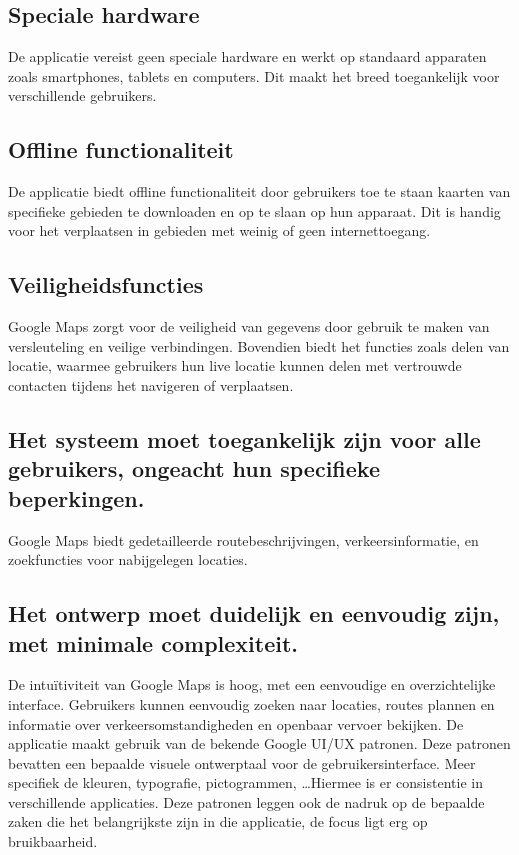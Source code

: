 \subsection*{Speciale hardware}
De applicatie vereist geen speciale hardware en werkt op standaard apparaten zoals smartphones, tablets en computers. Dit maakt het breed toegankelijk voor verschillende gebruikers.

\subsection*{Offline functionaliteit}
De applicatie biedt offline functionaliteit door gebruikers toe te staan kaarten van specifieke gebieden te downloaden en op te slaan op hun apparaat. Dit is handig voor het verplaatsen in gebieden met weinig of geen internettoegang.

\subsection*{Veiligheidsfuncties}
Google Maps zorgt voor de veiligheid van gegevens door gebruik te maken van versleuteling en veilige verbindingen. Bovendien biedt het functies zoals delen van locatie, waarmee gebruikers hun live locatie kunnen delen met vertrouwde contacten tijdens het navigeren of verplaatsen.

\subsection*{Het systeem moet toegankelijk zijn voor alle gebruikers, ongeacht hun specifieke beperkingen.}
Google Maps biedt gedetailleerde routebeschrijvingen, verkeersinformatie, en zoekfuncties voor nabijgelegen locaties.
\subsection*{Het ontwerp moet duidelijk en eenvoudig zijn, met minimale complexiteit.}
De intuïtiviteit van Google Maps is hoog, met een eenvoudige en overzichtelijke interface. Gebruikers kunnen eenvoudig zoeken naar locaties, routes plannen en informatie over verkeersomstandigheden en openbaar vervoer bekijken. De applicatie maakt gebruik van de bekende Google UI/UX patronen. Deze patronen bevatten een bepaalde visuele ontwerptaal voor de gebruikersinterface. Meer specifiek de kleuren, typografie, pictogrammen, \ldots Hiermee is er consistentie in verschillende applicaties. Deze patronen leggen ook de nadruk op de bepaalde zaken die het belangrijkste zijn in die applicatie, de focus ligt erg op bruikbaarheid.
